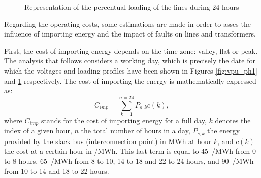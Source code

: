 \begin{figure}[!htb]\centering
{}
    \caption{Representation of the percentual loading of the lines during 24 hours}
    \label{fig:lines_ph1}
  \end{figure}


\clearpage
\newpage
Regarding the operating costs, some estimations are made in order to asses the influence of importing energy and the impact of faults on lines and transformers. 

First, the cost of importing energy depends on the time zone: valley, flat or peak. The analysis that follows considers a working day, which is precisely the date for which the voltages and loading profiles have been shown in Figures \ref{fig:vpu_ph1} and \ref{fig:lines_ph1} respectively. The cost of importing the energy is mathematically expressed as:
\begin{equation}
  C_{imp} = \sum_{k=1}^{n=24}P_{s,k} c(k),
  \label{eq:cimp}
\end{equation}
where $C_{imp}$ stands for the cost of importing energy for a full day, $k$ denotes the index of a given hour, $n$ the total number of hours in a day, $P_{s,k}$ the energy provided by the slack bus (interconnection point) in MWh at hour $k$, and $c(k)$ the cost at a certain hour in \texteuro/MWh. This last term is equal to 45~\texteuro/MWh from 0 to 8 hours, 65~\texteuro/MWh from 8 to 10, 14 to 18 and 22 to 24 hours, and 90~\texteuro/MWh from 10 to 14 and 18 to 22 hours. 


